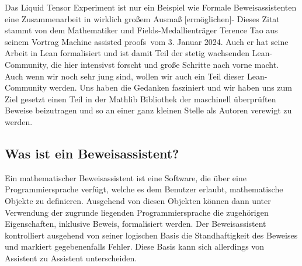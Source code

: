 \documentclass[10pt]{article}
\begin{document}

\noindent Das Liquid Tensor Experiment ist nur ein Beispiel wie \glqq  Formale Beweisassistenten eine Zusammenarbeit in wirklich großem Ausmaß [ermöglichen]\grqq - Dieses Zitat stammt von dem Mathematiker und Fields-Medallienträger Terence Tao aus seinem Vortrag \glqq Machine assisted proofs\grqq~vom 3. Januar 2024. Auch er hat seine Arbeit in Lean formalisiert und ist damit Teil der stetig wachsenden Lean-Community, die hier intensivst forscht und große Schritte nach vorne macht. Auch wenn wir noch sehr jung sind, wollen wir auch ein Teil dieser Lean-Community werden. Uns haben die Gedanken fasziniert und wir haben uns zum Ziel gesetzt einen Teil in der Mathlib Bibliothek der maschinell überprüften Beweise beizutragen und so an einer ganz kleinen Stelle als Autoren verewigt zu werden.\par


\subsection{Was ist ein Beweisassistent?}

\noindent Ein mathematischer Beweisassistent ist eine Software, die über eine Programmiersprache verfügt, welche es dem Benutzer erlaubt, mathematische Objekte zu definieren. Ausgehend von diesen Objekten können dann unter Verwendung der zugrunde liegenden Programmiersprache die zugehörigen Eigenschaften, inklusive Beweis, formalisiert werden. Der Beweisassistent kontrolliert ausgehend von seiner logischen Basis die Standhaftigkeit des Beweises und markiert gegebenenfalls Fehler. Diese Basis kann sich allerdings von Assistent zu Assistent unterscheiden. 
\end{document}
